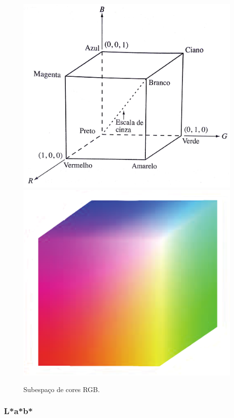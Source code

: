 \begin{figure}[H]
\centering
    \caption{\label{img:rgb_cube} Subespaço de cores RGB.}
    \includegraphics[scale=0.09]{img/rgb_cube}
    \includegraphics[scale=0.15]{img/rgb_cube2}
\end{figure}

\subsubsection{L*a*b*}

